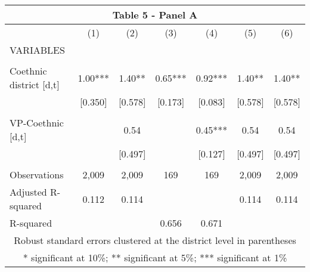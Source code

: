 \begin{tabular}{lcccccc}
\multicolumn{7}{c}{Table 5 - Panel A} \\ \hline
 & (1) & (2) & (3) & (4) & (5) & (6) \\
VARIABLES &  &  &  &  &  &  \\ \hline
 &  &  &  &  &  &  \\
Coethnic district [d,t] & 1.00*** & 1.40** & 0.65*** & 0.92*** & 1.40** & 1.40** \\
 & [0.350] & [0.578] & [0.173] & [0.083] & [0.578] & [0.578] \\
 &  &  &  &  &  &  \\
VP-Coethnic [d,t] &  & 0.54 &  & 0.45*** & 0.54 & 0.54 \\
 &  & [0.497] &  & [0.127] & [0.497] & [0.497] \\
 &  &  &  &  &  &  \\
Observations & 2,009 & 2,009 & 169 & 169 & 2,009 & 2,009 \\
Adjusted R-squared & 0.112 & 0.114 &  &  & 0.114 & 0.114 \\
 R-squared &  &  & 0.656 & 0.671 &  &  \\ \hline
\multicolumn{7}{c}{ Robust standard errors clustered at the district level in parentheses} \\
\multicolumn{7}{c}{ * significant at 10\%; ** significant at 5\%; *** significant at 1\%} \\
\end{tabular}
